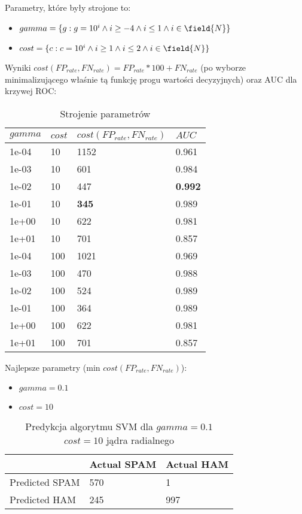 \documentclass[fleqn]{article}
\begin{document}
Parametry, które były strojone to:
\begin{itemize}
    \item $gamma = \{g: g=10^i \land i \geq -4 \land i \leq 1 \land i \in \field{N}  \}$
    \item $cost  = \{c: c=10^i \land i \geq 1 \land i \leq 2 \land i \in \field{N} \}$
\end{itemize}

Wyniki $cost(FP_{rate}, FN_{rate}) = FP_{rate} * 100 + FN_{rate}$ (po wyborze minimalizującego właśnie tą funkcję progu wartości decyzyjnych) oraz AUC dla krzywej ROC:

\begin{table}[h!]
  \centering
  \label{tab:table1}
  \begin{tabular}{l|l||l|l}
    $gamma$ & $cost$ & $cost(FP_{rate}, FN_{rate})$  & $AUC$\\
    \hline
    1e-04 &  10 & 1152 & 0.961 \\
    1e-03 &  10 &  601 & 0.984 \\
    1e-02 &  10 &  447 & \textbf{0.992} \\
    1e-01 &  10 &  \textbf{345} & 0.989 \\
    1e+00 &  10 &  622 & 0.981 \\
    1e+01 &  10 &  701 & 0.857 \\
    1e-04 & 100 & 1021 & 0.969 \\
    1e-03 & 100 &  470 & 0.988 \\
    1e-02 & 100 &  524 & 0.989 \\
    1e-01 & 100 &  364 & 0.989 \\
    1e+00 & 100 &  622 & 0.981 \\
    1e+01 & 100 &  701 & 0.857 \\
  \end{tabular}
  \caption{Strojenie parametrów}
\end{table}

Najlepsze parametry (min $cost(FP_{rate}, FN_{rate})$):
\begin{itemize}
    \item $gamma = 0.1$
    \item $cost  = 10$
\end{itemize}

\begin{table}[h!]
  \centering
  \label{tab:table1}
  \begin{tabular}{l||l|l}
     & Actual SPAM & Actual HAM\\
    \hline
    Predicted SPAM & 570 & 1\\
    Predicted HAM & 245 & 997\\
  \end{tabular}
  \caption{Predykcja algorytmu SVM dla $gamma = 0.1$
$cost  = 10$ jądra radialnego }
\end{table}
\end{document}
